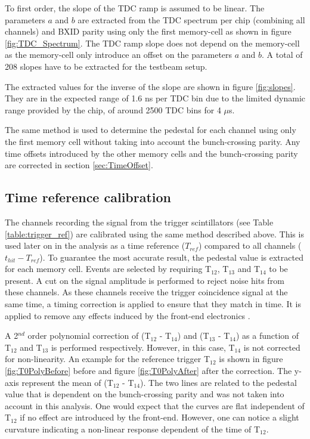 \documentclass{JINST}
\begin{document}
To first order, the slope of the TDC ramp is assumed to be linear. The parameters $a$ and $b$ are extracted from the TDC spectrum per chip (combining all channels) and BXID parity using only the first memory-cell as shown in figure \ref{fig:TDC_Spectrum}. The TDC ramp slope does not depend on the memory-cell as the memory-cell only introduce an offset on the parameters $a$ and $b$. A total of 208 slopes have to be extracted for the testbeam setup.

The extracted values for the inverse of the slope are shown in figure \ref{fig:slopes}. They are in the expected range of 1.6 ns per TDC bin due to the limited dynamic range provided by the chip, of around 2500 TDC bins for 4 $\mu$s.

The same method is used to determine the pedestal for each channel using only the first memory cell without taking into account the bunch-crossing parity. Any time offsets introduced by the other memory cells and the bunch-crossing parity are corrected in section \ref{sec:TimeOffset}.

\subsection{Time reference calibration}
\label{subsec:TimeRefCalib}

The channels recording the signal from the trigger scintillators (see Table \ref{table:trigger_ref}) are calibrated using the same method described above. This is used later on in the analysis as a time reference ($T_{ref}$) compared to all channels ($t_{hit} - T_{ref}$). To guarantee the most accurate result, the pedestal value is extracted for each memory cell. Events are selected by requiring T$_{12}$, T$_{13}$ and T$_{14}$ to be present. A cut on the signal amplitude is performed to reject noise hits from these channels. As these channels receive the trigger coincidence signal at the same time, a timing correction is applied to ensure that they match in time. It is applied to remove any effects induced by the front-end electronics \cite{Hartbrich2011, Brianne2012}.

A 2$^{nd}$ order polynomial correction of (T$_{12}$ - T$_{14}$) and (T$_{13}$ - T$_{14}$) as a function of T$_{12}$ and T$_{13}$ is performed respectively. However, in this case, T$_{14}$ is not corrected for non-linearity. An example for the reference trigger T$_{12}$ is shown in figure \ref{fig:T0PolyBefore} before and figure \ref{fig:T0PolyAfter} after the correction. The y-axis represent the mean of (T$_{12}$ - T$_{14}$). The two lines are related to the pedestal value that is dependent on the bunch-crossing parity and was not taken into account in this analysis. One would expect that the curves are flat independent of T$_{12}$ if no effect are introduced by the front-end. However, one can notice a slight curvature indicating a non-linear response dependent of the time of T$_{12}$.
\end{document}
